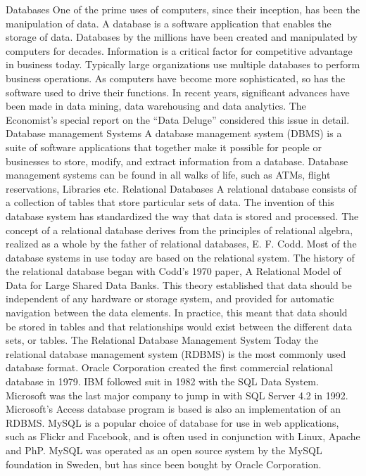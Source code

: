\documentclass[]{article}
\begin{document}
Databases
One of the prime uses of computers, since their inception, has been the manipulation of data. A database is a software application that enables the storage of data. Databases by the millions have been created and manipulated by computers for decades.  Information is a critical factor for competitive advantage in business today. Typically large organizations use multiple databases to perform business operations.
As computers have become more sophisticated, so has the software used to drive their functions. In recent years, significant advances have been made in data mining, data warehousing and data analytics. The Economist’s special report on the “Data Deluge” considered this issue in detail.
Database management Systems
A database management system (DBMS) is a suite of software applications that together make it possible for people or businesses to store, modify, and extract information from a database. Database management systems can be found in all walks of life, such as ATMs, flight reservations, Libraries etc.
Relational Databases
A relational database consists of a collection of tables that store particular sets of data. The invention of this database system has standardized the way that data is stored and processed. The concept of a relational database derives from the principles of relational algebra, realized as a whole by the father of relational databases, E. F. Codd. Most of the database systems in use today are based on the relational system.
The history of the relational database began with Codd's 1970 paper, A Relational Model of Data for Large Shared Data Banks. This theory established that data should be independent of any hardware or storage system, and provided for automatic navigation between the data elements. In practice, this meant that data should be stored in tables and that relationships would exist between the different data sets, or tables.
The Relational Database Management System
Today the relational database management system (RDBMS)  is the most commonly used database format. Oracle Corporation created the first commercial relational database in 1979. IBM followed suit in 1982 with the SQL Data System. Microsoft was the last major company to jump in with SQL Server 4.2 in 1992. Microsoft's Access database program is based is also an implementation of an RDBMS.
 MySQL is a popular choice of database for use in web applications, such as Flickr and Facebook, and is often used in conjunction with Linux, Apache and PhP.  MySQL was operated as an open source system by the MySQL foundation in Sweden, but has since been bought by Oracle Corporation.
\end{document}
